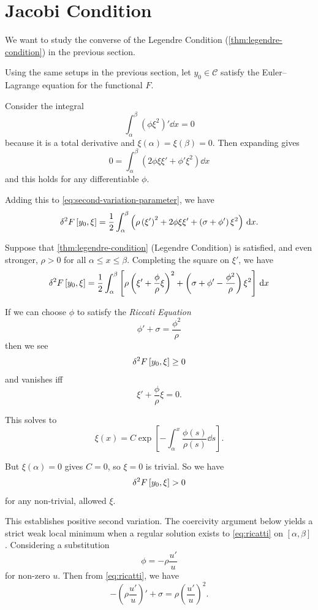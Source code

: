 \documentclass[11pt]{article}
\numberwithin{equation}{section}
\theoremstyle{definition}
\theoremstyle{remark}
\newcommand{\pqty}[1]{\left(#1\right)}
\newcommand{\bqty}[1]{\left[#1\right]}
\newcommand{\ccintv}[2]{[#1,#2]}
\newcommand{\contClassSymb}{\mathcal{C}}
\begin{document}
\section{Jacobi Condition}

We want to study the converse of the Legendre Condition (\autoref{thm:legendre-condition}) in the previous section.

Using the same setups in the previous section, let \(y_0 \in \contClassSymb\) satisfy the Euler--Lagrange equation for the functional \(F\).

Consider the integral
\[
    \int_{\alpha}^{\beta} \pqty{\phi \xi^2}' \dd{x} = 0
\]
because it is a total derivative and \(\xi(\alpha)=\xi(\beta)=0\). Then expanding gives
\[
    0 = \int_{\alpha}^{\beta} \pqty{2 \phi \xi \xi' + \phi' \xi^2} \dd{x}
\]
and this holds for any differentiable \(\phi\).

Adding this to \autoref{eq:second-variation-parameter}, we have
\[
    \var[2]{F\bqty{y_0, \xi}} = \frac{1}{2} \int_{\alpha}^{\beta} \pqty{\rho \pqty{\xi'}^2 + 2 \phi \xi \xi' + \pqty{\sigma + \phi'} \xi^2} \dd{x}.
\]

Suppose that \autoref{thm:legendre-condition} (Legendre Condition) is satisfied, and even stronger, \(\rho > 0\) for all \(\alpha \leq x \leq \beta\). Completing the square on \(\xi'\), we have
\[
    \var[2]{F\bqty{y_0, \xi}} = \frac{1}{2} \int_{\alpha}^{\beta} \bqty{\rho \pqty{\xi ' + \frac{\phi}{\rho} \xi}^2 + \pqty{\sigma + \phi ' - \frac{\phi^2}{\rho}} \xi^2} \dd{x}
\]

If we can choose \(\phi\) to satisfy the \emph{Riccati Equation}
\begin{equation}
    \label{eq:ricatti}%
    \phi' + \sigma = \frac{\phi^2}{\rho}
\end{equation}
then we see
\[
    \var[2]{F\bqty{y_0, \xi}} \geq 0
\]
and vanishes iff
\[
    \xi' + \frac{\phi}{\rho} \xi = 0.
\]

This solves to
\[
    \xi \pqty{x} = C \exp \bqty{- \int_{\alpha}^{x} \frac{\phi\pqty{s}}{\rho\pqty{s}} \dd{s}}.
\]

But \(\xi\pqty{\alpha} = 0\) gives \(C = 0\), so \(\xi = 0\) is trivial. So we have
\[
    \var[2]{F\bqty{y_0, \xi}} > 0
\]
for any non-trivial, allowed \(\xi\).

This establishes positive second variation. The coercivity argument below yields a strict weak local minimum when a regular solution exists to \autoref{eq:ricatti} on \(\ccintv{\alpha}{\beta}\). Considering a substitution
\[
    \phi = - \rho \frac{u'}{u}
\]
for non-zero \(u\). Then from \autoref{eq:ricatti}, we have
\[
    - \pqty{\rho \frac{u'}{u}}' + \sigma = \rho \pqty{\frac{u'}{u}}^2.
\]
\end{document}
